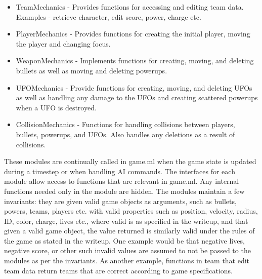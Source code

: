 \documentclass{article}
\begin{document}
\begin{itemize}
\item TeamMechanics - Provides functions for accessing and editing team data. Examples - retrieve character, edit score, power, charge etc.
\item PlayerMechanics - Provides functions for creating the initial player, moving the player and changing focus.
\item WeaponMechanics - Implements functions for creating, moving, and deleting bullets as well as moving and deleting powerups.
\item UFOMechanics - Provide functions for creating, moving, and deleting UFOs as well as handling any damage to the UFOs and creating scattered powerups when a UFO is destroyed.
\item CollisionMechanics - Functions for handling collisions between players, bullets, powerups, and UFOs.  Also handles any deletions as a result of collisions.
\end{itemize}

These modules are continually called in game.ml when the game state is updated during a timestep or when handling AI commands. The interfaces for each module allow access to  functions that are relevant in game.ml. Any internal functions needed only in the module are hidden. The modules maintain a few invariants:  they are given valid game objects as arguments, such as bullets, powers, teams, players etc. with valid properties such as position, velocity, radius, ID, color, charge, lives etc., where valid is as specified in the writeup, and that given a valid game object, the value returned is similarly valid under the rules of the game as stated in the writeup. One example would be that negative lives, negative score, or other such invalid values are assumed to not be passed to the modules as per the invariants. As another example, functions in team that edit team data return teams that are correct according to game specifications.
\end{document}
